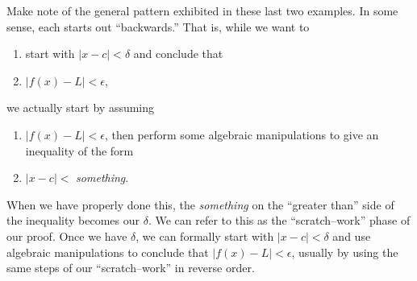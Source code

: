 %
%

Make note of the general pattern exhibited in these last two examples. In some sense, each starts out ``backwards.'' That is, while we want to
\begin{enumerate}
	\item start with $|x-c|<\delta$ and conclude that
	\item $|f(x)-L|<\epsilon$,
\end{enumerate}
we actually start by assuming 
\begin{enumerate}
	\item $|f(x)-L|<\epsilon$, then perform some algebraic manipulations to give an inequality of the form
	\item $|x-c|<$ \textit{something}.
\end{enumerate} 
When we have properly done this, the \textit{something} on the ``greater than'' side of the inequality becomes our $\delta$. We can refer to this as the ``scratch--work'' phase of our proof. Once we have $\delta$, we can formally start with $|x-c|<\delta$ and use algebraic manipulations to conclude that $|f(x)-L|<\epsilon$, usually by using the same steps of our ``scratch--work'' in reverse order.

